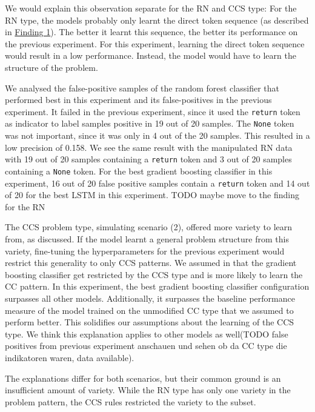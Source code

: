 We would explain this observation separate for the RN and CCS type:
For the RN type, the models probably only learnt the direct token sequence (as described in \hyperref[finding:return_none_manipulated_bad]{Finding 1}). The better it learnt this sequence, the better its performance on the previous experiment. For this experiment, learning the direct token sequence would result in a low performance. Instead, the model would have to learn the structure of the problem. 

We analysed the false-positive samples of the random forest classifier that performed best in this experiment and its false-positives in the previous experiment. It failed in the previous experiment, since it used the \texttt{return} token as indicator to label samples positive in 19 out of 20 samples. The \texttt{None} token was not important, since it was only in 4 out of the 20 samples. This resulted in a low precision of 0.158. We see the same result with the manipulated RN data with 19 out of 20 samples containing a \texttt{return} token and 3 out of 20 samples containing a \texttt{None} token. For the best gradient boosting classifier in this experiment, 16 out of 20 false positive samples contain a \texttt{return} token and 14 out of 20 for the best LSTM in this experiment.
TODO maybe move to the finding for the RN



The CCS problem type, simulating scenario (2), offered more variety to learn from, as discussed. If the model learnt a general problem structure from this variety, fine-tuning the hyperparameters for the previous experiment would restrict this generality to only CCS patterns. We assumed in  that the gradient boosting classifier get restricted by the CCS type and is more likely to learn the CC pattern. In this experiment, the best gradient boosting classifier configuration surpasses all other models. Additionally, it surpasses the baseline performance measure of the model trained on the unmodified CC type that we assumed to perform better. This solidifies our assumptions about the learning of the CCS type. We think this explanation applies to other models as well(TODO false positives from previous experiment anschauen und sehen ob da CC type die indikatoren waren, data available).

The explanations differ for both scenarios, but their common ground is an insufficient amount of variety. While the RN type has only one variety in the problem pattern, the CCS rules restricted the variety to the subset.

